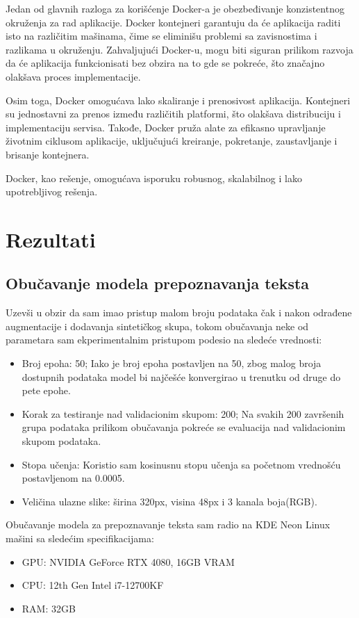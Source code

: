 \documentclass[a4paper,12pt]{article}
\begin{document}
	Jedan od glavnih razloga za korišćenje Docker-a je obezbeđivanje konzistentnog okruženja za rad aplikacije. Docker kontejneri garantuju da će aplikacija raditi isto na različitim mašinama, čime se eliminišu problemi sa zavisnostima i razlikama u okruženju. Zahvaljujući Docker-u, mogu biti siguran prilikom razvoja da će aplikacija funkcionisati bez obzira na to gde se pokreće, što značajno olakšava proces implementacije.
	
	Osim toga, Docker omogućava lako skaliranje i prenosivost aplikacija. Kontejneri su jednostavni za prenos između različitih platformi, što olakšava distribuciju i implementaciju servisa. Takođe, Docker pruža alate za efikasno upravljanje životnim ciklusom aplikacije, uključujući kreiranje, pokretanje, zaustavljanje i brisanje kontejnera.
	
	Docker, kao rešenje, omogućava isporuku robusnog, skalabilnog i lako upotrebljivog rešenja.
	\newpage
	
	\section{Rezultati}
	
	\subsection{Obučavanje modela prepoznavanja teksta}
	Uzevši u obzir da sam imao pristup malom broju podataka čak i nakon odrađene augmentacije i dodavanja sintetičkog skupa, tokom obučavanja neke od parametara sam ekperimentalnim pristupom podesio na sledeće vrednosti:
	\begin{itemize}
		\item Broj epoha: 50; Iako je broj epoha postavljen na 50, zbog malog broja dostupnih podataka model bi najčešće konvergirao u trenutku od druge do pete epohe.
		\item Korak za testiranje nad validacionim skupom: 200; Na svakih 200 završenih grupa podataka prilikom obučavanja pokreće se evaluacija nad validacionim skupom podataka.
		\item Stopa učenja: Koristio sam kosinusnu stopu učenja sa početnom vrednošću postavljenom na 0.0005.
		\item Veličina ulazne slike: širina 320px, visina 48px i 3 kanala boja(RGB).
	\end{itemize}
	
	Obučavanje modela za prepoznavanje teksta sam radio na KDE Neon Linux mašini sa sledećim specifikacijama:
	\begin{itemize}
		\item GPU: NVIDIA GeForce RTX 4080, 16GB VRAM
		\item CPU: 12th Gen Intel i7-12700KF
		\item RAM: 32GB
	\end{itemize}
\end{document}
